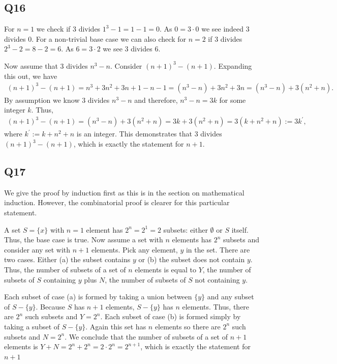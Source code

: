 \documentclass[12pt]{article}
\numberwithin{theorem}{section}
\numberwithin{equation}{section}
\numberwithin{remark}{section}
\numberwithin{definition}{section}
\numberwithin{theorem}{section}
\numberwithin{lemma}{section}
\numberwithin{example}{section}
\begin{document}
\subsection{Q16}

For $n=1$ we check if $3$ divides $1^3-1=1-1=0$. As $0 = 3\cdot 0$ we see indeed $3$ divides $0$. For a non-trivial base case we can also check for $n=2$ if $3$ divides $2^3-2=8-2=6$. As $6 = 3\cdot 2$ we see $3$ divides $6$. 

Now assume that $3$ divides $n^3-n$. Consider $(n+1)^3-(n+1)$. Expanding this out, we have  
\begin{align*}
	(n+1)^3-(n+1) = n^3 + 3n^2+3n +1 - n - 1 = \left(n^3-n\right) + 3n^2+3n = \left(n^3-n\right) + 3(n^2+n). 
\end{align*}
By assumption we know $3$ divides $n^3-n$ and therefore, $n^3-n = 3k$ for some integer $k$. Thus, 
\begin{align*}
	(n+1)^3-(n+1) = \left(n^3-n\right) + 3(n^2+n)  = 3k + 3(n^2+n) = 3\left(k+ n^2 + n\right) := 3k^\prime, 
\end{align*}
where $k^\prime := k+ n^2 + n$ is an integer. This demonstrates that $3$ divides $(n+1)^3-(n+1)$, which is exactly the statement for $n+1$.



\subsection{Q17}

We give the proof by induction first as this is in the section on mathematical induction. However, the combinatorial proof is clearer for this particular statement. 

A set $S=\{x\}$ with $n=1$ element has $2^n=2^1=2$ subsets: either $\emptyset$ or $S$ itself. Thus, the base case is true. Now assume a set with $n$ elements has $2^n$ subsets and consider any set with $n+1$ elements. Pick any element, $y$ in the set. There are two cases. Either (a) the subset contains $y$ or (b) the subset does not contain $y$. Thus, the number of subsets of a set of $n$ elements is equal to $Y$, the number of subsets of $S$ containing $y$ plus $N$, the number of subsets of $S$ not containing $y$. 

Each subset of case (a) is formed by taking a union between $\{y\}$ and any subset of $S-\{y\}$. Because $S$ has $n+1$ elements, $S-\{y\}$ has $n$ elements. Thus, there are $2^n$ such subsets and $Y=2^n$. Each subset of case (b) is formed simply by taking a subset of $S-\{y\}$. Again this set has $n$ elements so there are $2^n$ such subsets and $N=2^n$. We conclude that the number of subsets of a set of $n+1$ elements is $Y+N=2^n+2^n=2\cdot2^n=2^{n+1}$, which is exactly the statement for $n+1$
\end{document}
